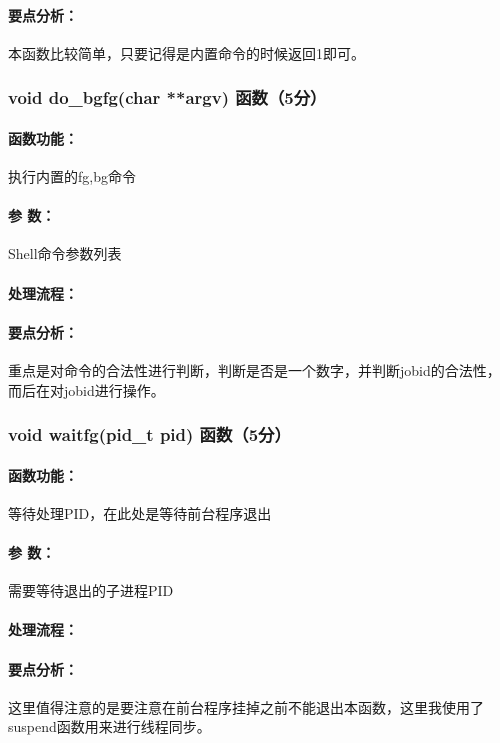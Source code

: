 \paragraph{要点分析：}本函数比较简单，只要记得是内置命令的时候返回1即可。

\subsubsection{void do\_bgfg(char **argv) 函数（5分）}

\paragraph{函数功能：}执行内置的fg,bg命令
\paragraph{参   数：}Shell命令参数列表
\paragraph{处理流程：}
\paragraph{要点分析：}重点是对命令的合法性进行判断，判断是否是一个数字，并判断jobid的合法性，而后在对jobid进行操作。

\subsubsection{void waitfg(pid\_t pid) 函数（5分）}

\paragraph{函数功能：}等待处理PID，在此处是等待前台程序退出
\paragraph{参   数：}需要等待退出的子进程PID
\paragraph{处理流程：}
\paragraph{要点分析：}这里值得注意的是要注意在前台程序挂掉之前不能退出本函数，这里我使用了suspend函数用来进行线程同步。

